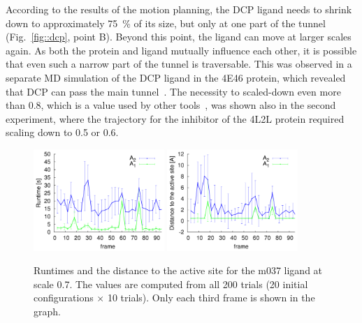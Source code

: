 \documentclass{bmcart}
\begin{document}
According to the results of the motion planning, the DCP ligand needs to shrink down to approximately 75~\% of its size, but only at one part of the tunnel (Fig.~\ref{fig::dcp}, point B). 
Beyond this point, the ligand can move at larger scales again.
As both the protein and ligand mutually influence each other, it is possible that even such a narrow part of the tunnel is traversable.
This was observed in a separate MD simulation of the DCP ligand in the 4E46 protein, which revealed that DCP can pass the main tunnel~\cite{marques2017catalytic}. 
The necessity to scaled-down even more than 0.8, which is a value used by other tools~\cite{cortes2010simulating}, was
shown also in the second experiment, where the trajectory for the inhibitor of the 4L2L protein required scaling down to 0.5 or 0.6.

{\def\a{0}
\begin{figure}[t]
\centering
\includegraphics[width=0.44\textwidth,angle=\a]{fig/crop3}
\includegraphics[width=0.44\textwidth,angle=\a]{fig/crop4}
\caption{\label{fig::comparison}
    \small
    Runtimes and the distance to the active site for the m037 ligand at scale 0.7.
    The values are computed from all 200 trials (20 initial configurations $\times$ 10 trials).
    Only each third frame is shown in the graph.
}
\end{figure}
}
\end{document}
